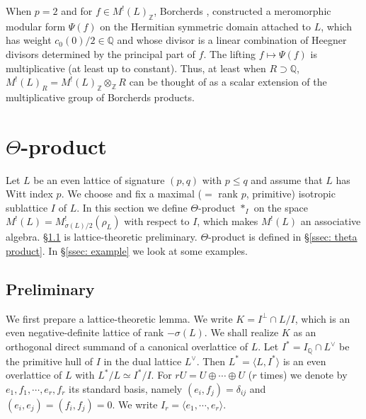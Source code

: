 \documentclass[12pt]{amsart}
\numberwithin{equation}{section}
\theoremstyle{definition}
\theoremstyle{remark}
\newcommand{\Z}{\mathbb{Z}}
\newcommand{\Q}{\mathbb{Q}}
\newcommand{\ML}{M^{!}(L)}
\newcommand{\MLZ}{M^{!}(L)_{\mathbb{Z}}}
\newcommand{\MLR}{M^{!}(L)_{R}}
\begin{document}
When $p=2$ and for $f\in{\MLZ}$, Borcherds \cite{Bo95}, \cite{Bo98} constructed a meromorphic modular form 
$\Psi(f)$ on the Hermitian symmetric domain attached to $L$, 
which has weight $c_{0}(0)/2\in {\Q}$ and whose divisor is 
a linear combination of Heegner divisors determined by the principal part of $f$. 
The lifting 
$f\mapsto \Psi(f)$ is multiplicative (at least up to constant). 
Thus, at least when $R\supset {\Q}$, 
${\MLR}={\MLZ}\otimes_{{\Z}}R$ can be thought of as a scalar extension of the multiplicative group of Borcherds products. 




\section{$\Theta$-product}\label{sec: product} 

Let $L$ be an even lattice of signature $(p, q)$ with $p\leq q$ 
and assume that $L$ has Witt index $p$. 
We choose and fix a maximal ($=$ rank $p$, primitive) isotropic sublattice $I$ of $L$. 
In this section we define $\Theta$-product $\ast_{I}$ on the space 
${\ML}=M_{\sigma(L)/2}^{!}(\rho_{L})$ 
with respect to $I$, 
which makes ${\ML}$ an associative algebra.  
\S \ref{ssec: lattice lemma} is lattice-theoretic preliminary. 
$\Theta$-product is defined in \S \ref{ssec: theta product}. 
In \S \ref{ssec: example} we look at some examples. 


\subsection{Preliminary}\label{ssec: lattice lemma}

We first prepare a lattice-theoretic lemma. 
We write $K=I^{\perp}\cap L/I$, which is an even negative-definite lattice of rank $-\sigma(L)$. 
We shall realize $K$ as an orthogonal direct summand of a canonical overlattice of $L$. 
Let $I^{\ast}=I_{{\Q}}\cap L^{\vee}$ be the primitive hull of $I$ in the dual lattice $L^{\vee}$. 
Then $L^{\ast}=\langle L, I^{\ast} \rangle$ is an even overlattice of $L$ with $L^{\ast}/L\simeq I^{\ast}/I$. 
For $rU=U\oplus \cdots \oplus U$ ($r$ times) 
we denote by $e_{1}, f_{1}, \cdots , e_{r}, f_{r}$ its standard basis, 
namely $(e_{i}, f_{j})=\delta_{ij}$ and $(e_i, e_j)=(f_i, f_j)=0$. 
We write $I_{r}=\langle e_{1}, \cdots, e_{r} \rangle$. 
\end{document}
